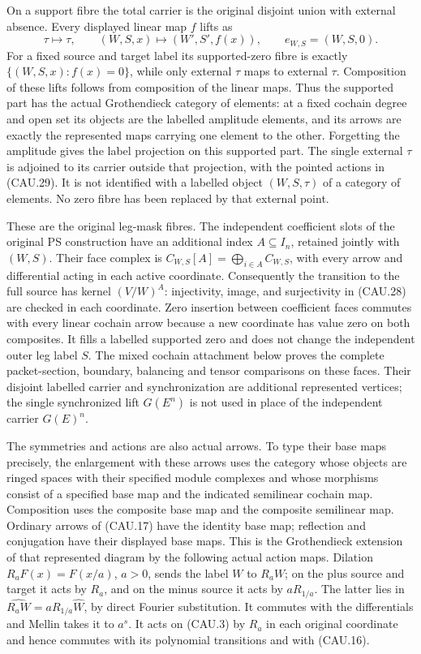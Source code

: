 On a support fibre the total carrier is the original disjoint union
with external absence.  Every displayed linear map $f$ lifts as
\[
 \tau\mapsto\tau,\qquad (W,S,x)\mapsto(W',S',f(x)),\qquad
 e_{W,S}=(W,S,0).                                             \tag{CAU.29}
\]
For a fixed source and target label its supported-zero fibre is exactly
$\{(W,S,x):f(x)=0\}$, while only external $\tau$ maps to external
$\tau$.  Composition of these lifts follows from composition of the
linear maps.  Thus the supported part has the actual Grothendieck
category of elements: at a fixed cochain degree and open set its objects
are the labelled amplitude elements, and its arrows are exactly the
represented maps carrying one element to the other.  Forgetting the
amplitude gives the label projection on this supported part.  The single
external $\tau$ is adjoined to its carrier outside that projection,
with the pointed actions in (CAU.29).  It is not identified with a
labelled object $(W,S,\tau)$ of a category of elements.  No zero fibre
has been replaced by that external point.

These are the original leg-mask fibres. The independent coefficient
slots of the original PS construction have an additional index
$A\subseteq I_n$, retained jointly with $(W,S)$. Their face complex
is $C_{W,S}[A]=\bigoplus_{i\in A}C_{W,S}$, with every arrow and
differential acting in each active coordinate. Consequently the
transition to the full source has kernel $(V/W)^A$: injectivity, image,
and surjectivity in (CAU.28) are checked in each coordinate.
Zero insertion between coefficient faces commutes with every
linear cochain arrow because a new coordinate has value zero on
both composites. It fills a labelled supported zero and does not
change the independent outer leg label $S$. The mixed cochain
attachment below proves the complete packet-section, boundary,
balancing and tensor comparisons on these faces. Their disjoint
labelled carrier and synchronization are additional represented
vertices; the single synchronized lift $G(E^n)$ is not used in
place of the independent carrier $G(E)^n$.

The symmetries and actions are also actual arrows.  To type their base
maps precisely, the enlargement with these arrows uses the category
whose objects are ringed spaces with their specified module complexes
and whose morphisms consist of a specified base map and the indicated
semilinear cochain map.  Composition uses the composite base map and
the composite semilinear map.  Ordinary arrows of (CAU.17) have the
identity base map; reflection and conjugation have their displayed
base maps.  This is the Grothendieck extension of that represented
diagram by the following actual action maps.  Dilation
$R_aF(x)=F(x/a)$, $a>0$, sends the label $W$ to $R_aW$;
on the plus source and target it acts by $R_a$, and on the minus
source it acts by $aR_{1/a}$.  The latter lies in
$\widehat{R_aW}=aR_{1/a}\widehat W$, by direct Fourier substitution.
It commutes with the differentials and Mellin takes it to $a^s$.
It acts on (CAU.3) by $R_a$ in each original coordinate and hence
commutes with its polynomial transitions and with (CAU.16).

